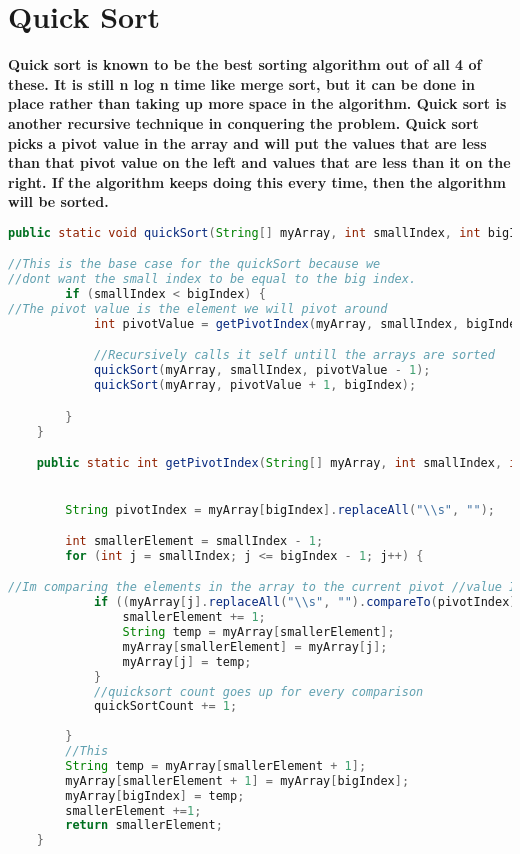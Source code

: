 \documentclass{article}
\begin{document}
\section{Quick Sort}
\textbf{Quick sort is known to be the best sorting algorithm out of all 4 of these. It is still n log n time like merge sort, but it can be done in place rather than taking up more space in the algorithm. Quick sort is another recursive technique in conquering the problem. Quick sort picks a pivot value in the array and will put the values that are less than that pivot value on the left and values that are less than it on the right. If the algorithm keeps doing this every time, then the algorithm will be sorted. }
\begin{lstlisting}[language = java]
public static void quickSort(String[] myArray, int smallIndex, int bigIndex) {

//This is the base case for the quickSort because we 
//dont want the small index to be equal to the big index.
        if (smallIndex < bigIndex) {
//The pivot value is the element we will pivot around
            int pivotValue = getPivotIndex(myArray, smallIndex, bigIndex);

            //Recursively calls it self untill the arrays are sorted
            quickSort(myArray, smallIndex, pivotValue - 1);
            quickSort(myArray, pivotValue + 1, bigIndex);

        }
    }

    public static int getPivotIndex(String[] myArray, int smallIndex, int bigIndex) {

        
        String pivotIndex = myArray[bigIndex].replaceAll("\\s", "");

        int smallerElement = smallIndex - 1;
        for (int j = smallIndex; j <= bigIndex - 1; j++) {

//Im comparing the elements in the array to the current pivot //value If the element is smaller than the right then it will be on //the left otherwise its on the right
            if ((myArray[j].replaceAll("\\s", "").compareTo(pivotIndex)) < 0) {
                smallerElement += 1;
                String temp = myArray[smallerElement];
                myArray[smallerElement] = myArray[j];
                myArray[j] = temp;
            }
            //quicksort count goes up for every comparison
            quickSortCount += 1;
            
        }
        //This 
        String temp = myArray[smallerElement + 1];
        myArray[smallerElement + 1] = myArray[bigIndex];
        myArray[bigIndex] = temp;
        smallerElement +=1;
        return smallerElement;
    }
\end{lstlisting}
\end{document}
